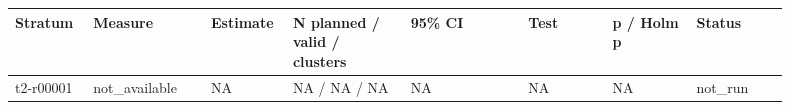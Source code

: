 \begingroup
\small
\setlength{\tabcolsep}{2pt}
\begin{longtable}{@{}p{0.09\linewidth}p{0.14\linewidth}p{0.08\linewidth}p{0.14\linewidth}p{0.14\linewidth}p{0.1\linewidth}p{0.1\linewidth}p{0.11\linewidth}@{}}
\hline
Stratum & Measure & Estimate & N planned / valid / clusters & 95\% CI & Test & p / Holm p & Status \\
\hline
t2-r00001 & not\_\allowbreak{}available & NA & NA / NA / NA & NA & NA & NA & not\_\allowbreak{}run \\
\hline
\end{longtable}
\endgroup
